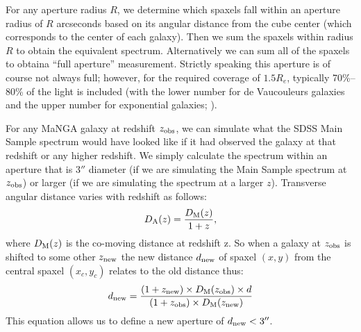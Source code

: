 For any aperture radius $R$, we determine which 
spaxels fall within an aperture radius of $R$ 
arcseconds based on its angular distance from the 
cube center (which corresponds to the center of 
each galaxy). Then we sum the spaxels within radius $R$ 
to obtain the equivalent spectrum. Alternatively we 
can sum all of the spaxels to obtaina ``full aperture''
measurement. Strictly speaking this aperture is of
course not always full; however, for the required
coverage of $1.5R_e$, typically 70\%--80\% of the 
light is included (with the lower number for de Vaucouleurs
galaxies and the upper number for exponential galaxies;
\citealt{graham05a}).




For any MaNGA galaxy at redshift $z_{\rm obs}$, we can simulate what
the SDSS Main Sample spectrum would have looked like if it had observed the 
galaxy at that redshift or any higher redshift. We simply calculate the 
spectrum within an aperture that is 3$''$ diameter (if we are simulating 
the Main Sample spectrum at $z_{\rm obs}$) or larger (if we are simulating
the spectrum at a larger $z$).
Transverse angular distance varies with redshift as follows:
$$D_{\rm A}(z) = \frac{D_{\rm M}(z)}{1+z}, $$
where $D_{\rm M}(z)$ is the co-moving distance at redshift z.
So when a galaxy at $z_{\rm obs}$ is shifted to some other
$z_{\rm new}$ the new distance $d_{\rm new}$ of spaxel $(x,y)$ 
from the central spaxel $(x_{c},y_{c})$ relates to the old distance thus:
$$ d_{\rm new} = \frac{(1+z_{\rm new})\times D_{\rm M}(z_{\rm obs}) \times d}{(1+z_{\rm obs}) \times  D_{\rm M}(z_{\rm new})} $$
This equation allows us to define a new aperture of $d_{\rm new} < 3''$.

